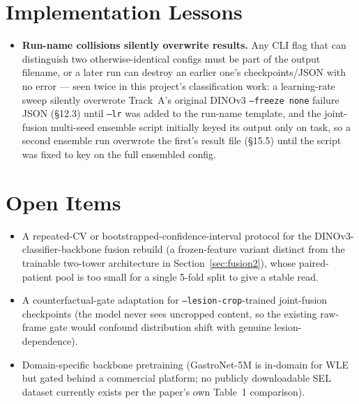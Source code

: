 \documentclass[10pt]{article}
\begin{document}
\clearpage
\section{Implementation Lessons}
\label{sec:lessons}

\begin{itemize}[nosep]
  \item \textbf{Run-name collisions silently overwrite results.} Any CLI flag that can distinguish two
    otherwise-identical configs must be part of the output filename, or a later run can destroy an earlier
    one's checkpoints/JSON with no error --- seen twice in this project's classification work: a learning-rate
    sweep silently overwrote Track~A's original DINOv3 \texttt{--freeze none} failure JSON (\S12.3) until
    \texttt{--lr} was added to the run-name template, and the joint-fusion multi-seed ensemble script
    initially keyed its output only on task, so a second ensemble run overwrote the first's result file
    (\S15.5) until the script was fixed to key on the full ensembled config.
\end{itemize}

\clearpage
\section{Open Items}
\label{sec:open}

\begin{itemize}[nosep]
  \item A repeated-CV or bootstrapped-confidence-interval protocol for the DINOv3-classifier-backbone
    fusion rebuild (a frozen-feature variant distinct from the trainable two-tower architecture in
    Section~\ref{sec:fusion2}), whose paired-patient pool is too small for a single 5-fold split to give a
    stable read.
  \item A counterfactual-gate adaptation for \texttt{--lesion-crop}-trained joint-fusion checkpoints (the
    model never sees uncropped content, so the existing raw-frame gate would confound distribution shift
    with genuine lesion-dependence).
  \item Domain-specific backbone pretraining (GastroNet-5M is in-domain for WLE but gated behind a
    commercial platform; no publicly downloadable SEL dataset currently exists per the paper's own Table~1
    comparison).
\end{itemize}
\end{document}
